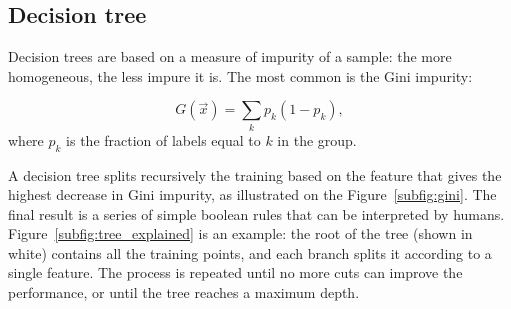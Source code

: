 \subsection{Decision tree}\label{sec:decision_tree}
Decision trees are based on a measure of impurity of a sample: the more homogeneous, the less impure it is.
The most common is the Gini impurity:

\[ G(\vec x) = \sum_k p_{k} (1-p_k),\]
where $p_k$ is the fraction of labels equal to $k$ in the group.

A decision tree splits recursively the training based on the feature that gives the highest decrease in Gini impurity, as illustrated on the Figure~\ref{subfig:gini}.
The final result is a series of simple boolean rules that can be interpreted by humans.
Figure~\ref{subfig:tree_explained} is an example: the root of the tree (shown in white) contains all the training points, and each branch splits it according to a single feature.
The process is repeated until no more cuts can improve the performance, or until the tree reaches a maximum depth.


